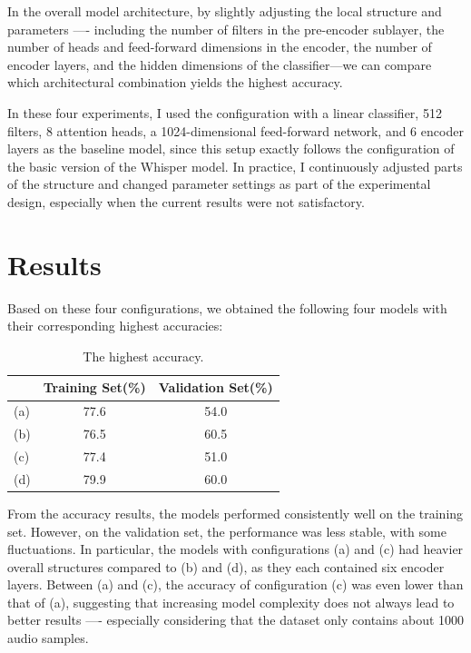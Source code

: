 \documentclass{article}
\begin{document}
      In the overall model architecture, by slightly adjusting the local structure and parameters —- including the number of filters in the pre-encoder sublayer, the number of heads and feed-forward dimensions in the encoder, the number of encoder layers, and the hidden dimensions of the classifier—we can compare which architectural combination yields the highest accuracy.

      In these four experiments, I used the configuration with a linear classifier, 512 filters, 8 attention heads, a 1024-dimensional feed-forward network, and 6 encoder layers as the baseline model, since this setup exactly follows the configuration of the basic version of the Whisper model. In practice, I continuously adjusted parts of the structure and changed parameter settings as part of the experimental design, especially when the current results were not satisfactory.


  \section{Results}

    Based on these four configurations, we obtained the following four models with their corresponding highest accuracies:

    \begin{table}[H]
      \caption{The highest accuracy.}
      \label{tbl:highest_acc}
      \centering
      \begin{tabular}{lcc}
        \toprule
        & Training Set(\%) & Validation Set(\%) \\
        \midrule
        (a) & 77.6 & 54.0 \\
        (b) & 76.5 & 60.5 \\
        (c) & 77.4 & 51.0 \\
        (d) & 79.9 & 60.0 \\
        \bottomrule
      \end{tabular}
    \end{table}
    
    From the accuracy results, the models performed consistently well on the training set. However, on the validation set, the performance was less stable, with some fluctuations. In particular, the models with configurations (a) and (c) had heavier overall structures compared to (b) and (d), as they each contained six encoder layers. Between (a) and (c), the accuracy of configuration (c) was even lower than that of (a), suggesting that increasing model complexity does not always lead to better results —- especially considering that the dataset only contains about 1000 audio samples.
\end{document}
